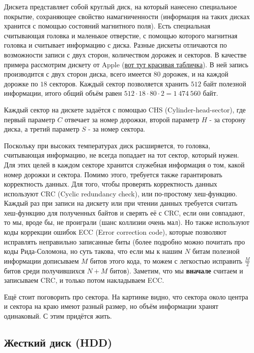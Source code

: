\documentclass[12pt, a4paper]{article}
\begin{document}
Дискета представляет собой круглый диск, на который нанесено специальное покрытие, сохраняющее свойство намагниченности (информация на таких дисках хранится с помощью состояний магнитного поля). Есть специальная считывающая головка и маленькое отверстие, с помощью которого магнитная головка и считывает информацию с диска. Разные дискеты отличаются по возможности записи с двух сторон, количеством дорожек и секторов. В качестве примера рассмотрим дискету от Apple (\href{https://en.wikipedia.org/wiki/List_of_floppy_disk_formats}{вот тут красивая табличка}). В ней запись производится с двух сторон диска, всего имеется $80$ дорожек, и на каждой дорожке по $18$ секторов. Каждый сектор позволяется хранить $512$ байт полезной информации, итого общий объём равен $512 \cdot 18 \cdot 80 \cdot 2 = 1 \ 474 \ 560$ байт.

Каждый сектор на дискете задаётся с помощью CHS (Cylinder-head-sector), где первый параметр $C$ отвечает за номер дорожки, второй параметр $H$ - за сторону диска, а третий параметр $S$ - за номер сектора. 

Поскольку при высоких температурах диск расширяется, то головка, считывающая информацию, не всегда попадает на тот сектор, который нужен. Для этих целей в каждом секторе хранится служебная информация о том, какой номер дорожки и сектора. Помимо этого, требуется также гарантировать корректность данных. Для того, чтобы проверять корректность данных используют CRC (Cyclic redundancy check), или по-простому хеш-функцию. Каждый раз при записи на дискету или при чтении данных требуется считать хеш-функцию для полученных байтов и сверять её с CRC, если они совпадают, то мы, вроде бы, не проиграли (шанс коллизии очень мал). Но также используют коды коррекции ошибок ECC (Error correction code), которые позволяют исправлять неправильно записанные биты (более подробно можно почитать про коды Рида-Соломона, но суть такова, что если мы к нашим $N$ битам полезной информации дописываем $M$ битов этого кода, то можем с легкостью исправить $\frac{M}{2}$ битов среди получившихся $N+M$ битов). Заметим, что мы \textbf{вначале} считаем и записываем CRC, и только потом накладываем ECC.

Ещё стоит поговорить про сектора. На картинке видно, что сектора около центра и сектора на краю имеют разный размер, но объём информации хранят одинаковый. С этим придётся жить.

\subsection{Жесткий диск (HDD)}
\end{document}
